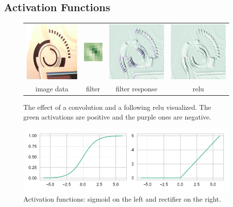 \subsection{Activation Functions} %
\label{sub:conepts:nn:activations}
\begin{figure}
    \centering
    \begin{tabulary}{\linewidth}{CCCC}
        \includegraphics[height=3cm]{figures/activation_data} &
        \vspace{-1.8cm}\includegraphics[height=1cm]{figures/activation_filter} &
        \includegraphics[height=3cm]{figures/activation_response} &
        \includegraphics[height=3cm]{figures/activation_relu} \\
        image data & filter & filter response & \gls{relu} \\
    \end{tabulary}
    \caption{The effect of a convolution and a following \gls{relu} visualized. The green activations are positive and the purple ones are negative.}
\end{figure}
\begin{figure}
    \includegraphics{figures/sigmoid_relu}
    \caption{Activation functions: sigmoid on the left and rectifier on the right.}
    \label{fig:sigmoid_relu}
\end{figure}
